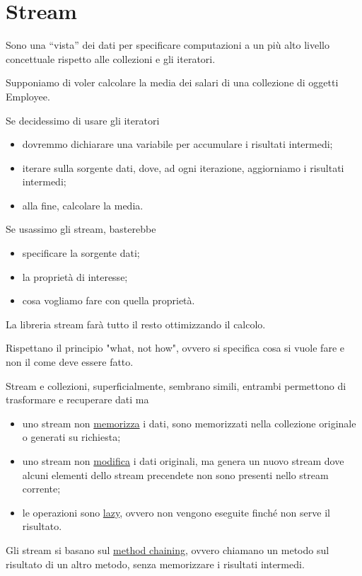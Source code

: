 \chapter{Stream}

Sono una “vista” dei dati per specificare computazioni a un più alto livello concettuale rispetto alle collezioni e gli iteratori.

Supponiamo di voler calcolare la media dei salari di una collezione di oggetti Employee.
\begin{multicols}{2}
Se decidessimo di usare gli iteratori
\begin{itemize}
    \item dovremmo dichiarare una variabile per accumulare i risultati intermedi;
    \item iterare sulla sorgente dati, dove, ad ogni iterazione, aggiorniamo i risultati intermedi;
    \item alla fine, calcolare la media.
\end{itemize}
\columnbreak
Se usassimo gli stream, basterebbe
\begin{itemize}
    \item specificare la sorgente dati;
    \item la proprietà di interesse;
    \item cosa vogliamo fare con quella proprietà.
\end{itemize}
La libreria stream farà tutto il resto ottimizzando il calcolo.
\end{multicols}

Rispettano il principio "what, not how", ovvero si specifica cosa si vuole fare e non il come deve essere fatto. 

Stream e collezioni, superficialmente, sembrano simili, entrambi permettono di trasformare e recuperare dati ma 
\begin{itemize}
    \item uno stream non \underline{memorizza} i dati, sono memorizzati nella collezione originale o generati su richiesta;
    \item uno stream non \underline{modifica} i dati originali, ma genera un nuovo stream dove alcuni elementi dello stream precendete non sono presenti nello 
    stream corrente;
    \item le operazioni sono \underline{lazy}, ovvero non vengono eseguite finché non serve il risultato.
\end{itemize}

Gli stream si basano sul \underline{method chaining}, ovvero chiamano un metodo sul risultato di un altro metodo, senza memorizzare i risultati intermedi.

